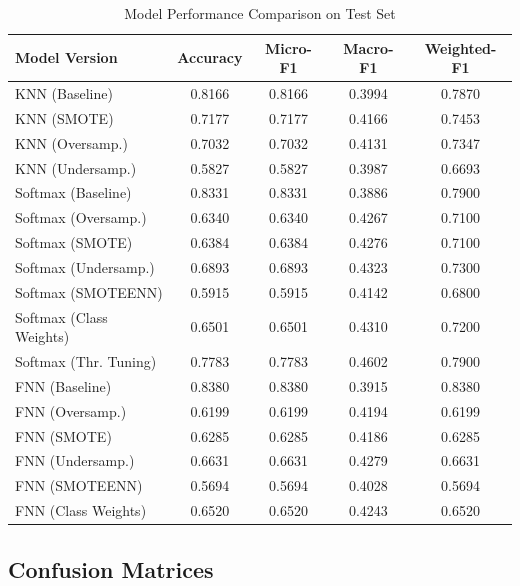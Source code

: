 \documentclass[12pt, a4paper]{article}
\begin{document}
\begin{table}[H]
    \centering
    \caption{Model Performance Comparison on Test Set}
    \label{tab:results}
    \begin{tabular}{lcccc}
        \toprule
        \textbf{Model Version} & \textbf{Accuracy} & \textbf{Micro-F1} & \textbf{Macro-F1} & \textbf{Weighted-F1} \\
        \midrule
        KNN (Baseline)      & 0.8166 & 0.8166 & 0.3994 & 0.7870 \\
        KNN (SMOTE)         & 0.7177 & 0.7177 & 0.4166 & 0.7453 \\
        KNN (Oversamp.)     & 0.7032 & 0.7032 & 0.4131 & 0.7347 \\
        KNN (Undersamp.)    & 0.5827 & 0.5827 & 0.3987 & 0.6693 \\
        \midrule
        Softmax (Baseline)          & 0.8331 & 0.8331 & 0.3886 & 0.7900 \\
        Softmax (Oversamp.)         & 0.6340 & 0.6340 & 0.4267 & 0.7100 \\
        Softmax (SMOTE)             & 0.6384 & 0.6384 & 0.4276 & 0.7100 \\
        Softmax (Undersamp.)        & 0.6893 & 0.6893 & 0.4323 & 0.7300 \\
        Softmax (SMOTEENN)          & 0.5915 & 0.5915 & 0.4142 & 0.6800 \\
        Softmax (Class Weights)     & 0.6501 & 0.6501 & 0.4310 & 0.7200 \\
        Softmax (Thr. Tuning)       & 0.7783 & 0.7783 & 0.4602 & 0.7900 \\
        \midrule
        FNN (Baseline)              & 0.8380 & 0.8380 & 0.3915 & 0.8380 \\
        FNN (Oversamp.)             & 0.6199 & 0.6199 & 0.4194 & 0.6199 \\
        FNN (SMOTE)                 & 0.6285 & 0.6285 & 0.4186 & 0.6285 \\
        FNN (Undersamp.)            & 0.6631 & 0.6631 & 0.4279 & 0.6631 \\
        FNN (SMOTEENN)              & 0.5694 & 0.5694 & 0.4028 & 0.5694 \\
        FNN (Class Weights)         & 0.6520 & 0.6520 & 0.4243 & 0.6520 \\
        \bottomrule
    \end{tabular}
\end{table}

\subsection{Confusion Matrices}
\end{document}
